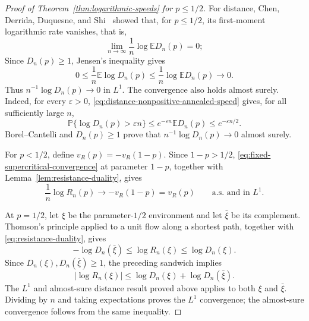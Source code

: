 \documentclass[a4paper,fleqn]{cas-sc}
\numberwithin{equation}{section}
\theoremstyle{plain}
\theoremstyle{definition}
\newcommand{\E}{\mathbb E}
\newcommand{\Pp}{\mathbb P}
\begin{document}
\begin{proof}[Proof of Theorem~\ref{thm:logarithmic-speeds}
for $p\le 1/2$]
For distance, Chen, Derrida, Duquesne, and
Shi~\cite{ChenDerridaDuquesneShi2026} showed that, for $p\le1/2$, its
first-moment logarithmic rate vanishes, that is,
\begin{equation}
 \lim_{n\to\infty}\frac1n\log\E D_n(p)=0;
 \label{eq:distance-nonpositive-annealed-speed}
\end{equation}
Since $D_n(p)\ge1$,
Jensen's inequality gives
\[
 0\le \frac1n\E\log D_n(p)
 \le \frac1n\log\E D_n(p)\longrightarrow0.
\]
Thus $n^{-1}\log D_n(p)\to0$ in $L^1$.
The convergence also holds almost surely.  Indeed, for every
$\varepsilon>0$,
\eqref{eq:distance-nonpositive-annealed-speed} gives, for all sufficiently
large $n$,
\[
 \Pp\{\log D_n(p)>\varepsilon n\}
 \le e^{-\varepsilon n}\E D_n(p)
 \le e^{-\varepsilon n/2}.
\]
Borel--Cantelli and $D_n(p)\ge1$ prove that
$n^{-1}\log D_n(p)\to0$ almost surely.

For $p<1/2$, define $v_R(p)=-v_R(1-p)$.  Since $1-p>1/2$,
\eqref{eq:fixed-supercritical-convergence} at parameter $1-p$,
together with Lemma~\ref{lem:resistance-duality}, gives
\[
 \frac1n\log R_n(p)\longrightarrow-v_R(1-p)=v_R(p)
\qquad\text{a.s. and in }L^1.
\]

At $p=1/2$, let $\xi$ be the parameter-$1/2$ environment and let $\bar\xi$ be its
complement.  Thomson's principle applied to a unit flow along a shortest path,
together with \eqref{eq:resistance-duality}, gives
\[
 -\log D_n(\bar\xi)
 \le \log R_n(\xi)
 \le \log D_n(\xi).
\]
Since $D_n(\xi),D_n(\bar\xi)\ge1$, the preceding sandwich implies
\[
 |\log R_n(\xi)|
 \le \log D_n(\xi)+\log D_n(\bar\xi).
\]
The $L^1$ and almost-sure distance result proved above applies to both $\xi$
and $\bar\xi$.  Dividing by $n$ and taking expectations proves the $L^1$
convergence; the almost-sure convergence follows from the same inequality.
\end{proof}
\end{document}
